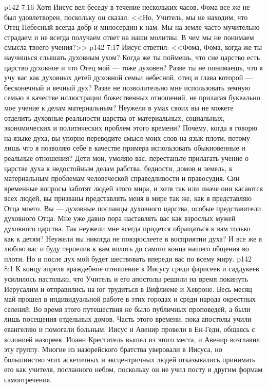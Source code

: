 \vs p142 7:16 Хотя Иисус вел беседу в течение нескольких часов, Фома все же не был удовлетворен, поскольку он сказал: <<Но, Учитель, мы не находим, что Отец Небесный всегда добр и милосердин к нам. Мы на земле часто мучительно страдаем и не всегда получаем ответ на наши молитвы. В чем мы не понимаем смысла твоего учения?>>
\vs p142 7:17 Иисус ответил: <<Фома, Фома, когда же ты научишься слышать духовным ухом? Когда же ты поймешь, что сие царство есть царство духовное и что Отец мой --- тоже духовен? Разве ты не понимаешь, что я учу вас как духовных детей духовной семьи небесной, отец и глава которой --- бесконечный и вечный дух? Разве не позволительно мне использовать земную семью в качестве иллюстрации божественных отношений, не прилагая буквально мое учение к делам материальным? Неужели в умах своих вы не можете отделить духовные реальности царства от материальных, социальных, экономических и политических проблем этого времени? Почему, когда я говорю на языке духа, вы упорно переводите смысл моих слов на язык плоти, потому лишь что я позволяю себе в качестве примера использовать обыкновенные и реальные отношения? Дети мои, умоляю вас, перестаньте прилагать учение о царстве духа к недостойным делам рабства, бедности, домов и земель, к материальным проблемам человеческой справедливости и правосудия. Сии временные вопросы заботят людей этого мира, и хотя так или иначе они касаются всех людей, вы призваны представлять меня в мире так же, как я представляю Отца моего. Вы --- духовные посланцы духовного царства, особые представители духовного Отца. Мне уже давно пора наставлять вас как взрослых мужей духовного царства. Так неужели мне всегда придется обращаться к вам только как к детям? Неужели вы никогда не повзрослеете в восприятии духа? И все же я люблю вас и буду терпелив к вам вплоть до самого конца нашего общения во плоти. Но и после дух мой будет шествовать впереди вас по всему миру.
\vs p142 8:1 К концу апреля враждебное отношение к Иисусу среди фарисеев и саддукеев усилилось настолько, что Учитель и его апостолы решили на время покинуть Иерусалим и отправились на юг трудиться в Вифлиеме и Хевроне. Весь месяц май прошел в индивидуальной работе в этих городах и среди народа окрестных селений. Во время этого путешествия не было публичных проповедей, а были лишь посещения отдельных домов. Часть этого времени, пока апостолы учили евангелию и помогали больным, Иисус и Авенир провели в Ен\hyp{}Геди, общаясь с колонией назореев. Иоанн Креститель вышел из этого места, и Авенир возглавил эту группу. Многие из назорейского братства уверовали в Иисуса, но большинство этих аскетичных и эксцентричных людей отказывались принимать его как учителя, посланного небом, поскольку он не учил посту и другим формам самоотречения.
